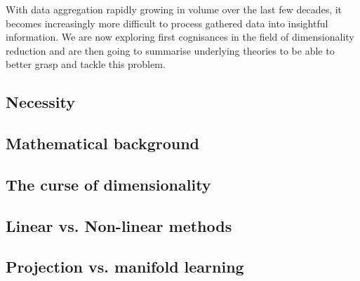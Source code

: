 With data aggregation rapidly growing in volume over the last few decades, it becomes increasingly more difficult to process gathered data into insightful information.
We are now exploring first cognisances in the field of dimensionality reduction and are then going to summarise underlying theories to be able to better grasp and tackle this problem.

\vfill



\subsection{Necessity}

\clearpage




\subsection{Mathematical background}




\subsection{The curse of dimensionality} \label{curseOfDimensionality}

\vfill
\clearpage


\subsection{Linear vs. Non-linear methods}

\clearpage


\subsection{Projection vs. manifold learning}

\clearpage
